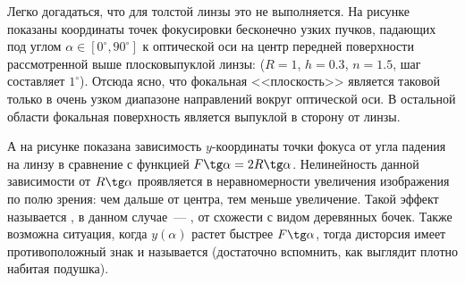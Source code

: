 Легко догадаться, что для толстой линзы это не выполняется. На рисунке  показаны координаты точек фокусировки бесконечно узких пучков, падающих под углом $\alpha \in [0^\circ, 90^\circ]$ к оптической оси на центр передней поверхности рассмотренной выше плосковыпуклой линзы: ($R = 1$, $h = 0.3$, $n=1.5$, шаг составляет $1^\circ$). Отсюда ясно, что фокальная <<плоскость>> является таковой только в очень узком диапазоне направлений вокруг оптической оси. В остальной области фокальная поверхность является выпуклой в сторону от линзы.

А на рисунке  показана зависимость $y$-координаты точки фокуса от угла падения на линзу в сравнение с функцией $F \tg \alpha = 2R \tg \alpha$. Нелинейность данной зависимости от $R \tg \alpha$ проявляется в неравномерности увеличения изображения по полю зрения: чем дальше от центра, тем меньше увеличение. Такой эффект называется , в данном случае~--- , от схожести с видом деревянных бочек. Также возможна ситуация, когда $y(\alpha)$ растет быстрее $F \tg \alpha$, тогда дисторсия имеет противоположный знак и называется  (достаточно вспомнить, как выглядит плотно набитая подушка).

